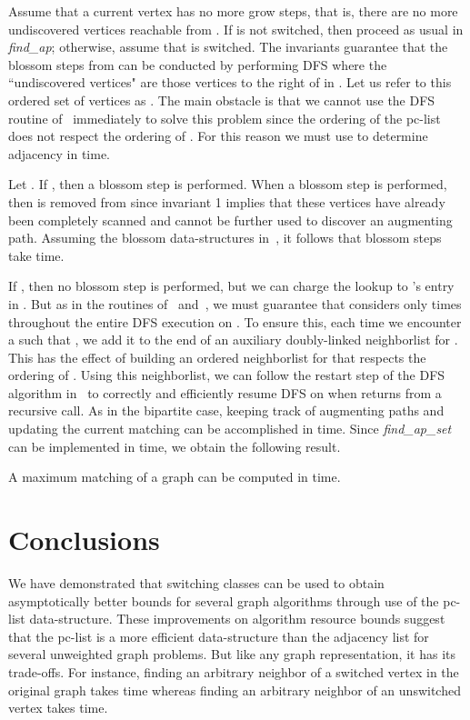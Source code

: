 \documentclass{llncs}
\begin{document}
Assume that a current vertex  has no more grow steps, that is, there are no more undiscovered vertices reachable from .
If  is not switched, then proceed as usual in \emph{find\_ap}; otherwise, assume that  is switched.
The invariants guarantee that the blossom steps from  can be conducted by performing DFS where the ``undiscovered vertices" are those vertices to the right of  in .  Let us refer to this ordered set of vertices as .  The main obstacle is that we cannot use the DFS routine of~\cite{LindzeyO13} immediately to solve this problem since the ordering of the pc-list does not respect the ordering of .  For this reason we must use  to determine adjacency in  time.  

Let .  If , then a blossom step is performed. When a blossom step is performed, then  is removed from  since invariant 1 implies that these vertices have already been completely scanned and cannot be further used to discover an augmenting path.  Assuming the blossom data-structures in~\cite{GabowT91}, it follows that blossom steps take  time.  

If , then no blossom step is performed, but we can charge the lookup to 's entry in .  But as in the routines of~\cite{DahlhausGM02} and~\cite{LindzeyO13}, we must guarantee that  considers  only  times throughout the entire DFS execution on .  To ensure this, each time we encounter a  such that , we add it to the end of an auxiliary doubly-linked neighborlist for .  This has the effect of building an ordered neighborlist for  that respects the ordering of .  Using this neighborlist, we can follow the restart step of the DFS algorithm in~\cite{LindzeyO13} to correctly and efficiently resume DFS on  when  returns from a recursive call. As in the bipartite case, keeping track of augmenting paths and updating the current matching can be accomplished in  time.  Since \emph{find\_ap\_set} can be implemented in  time, we obtain the following result.

\begin{theorem}\label{thm:maxmatch}
A maximum matching of a graph  can be computed in  time.
\end{theorem}

\section{Conclusions}


We have demonstrated that switching classes can be used to obtain asymptotically better bounds for several graph algorithms through use of the pc-list data-structure.  These improvements on algorithm resource bounds suggest that the pc-list is a more efficient data-structure than the adjacency list for several unweighted graph problems.  But like any graph representation, it has its trade-offs.  For instance, finding an arbitrary neighbor of a switched vertex  in the original graph takes  time whereas finding an arbitrary neighbor of an unswitched vertex takes  time.
\end{document}
